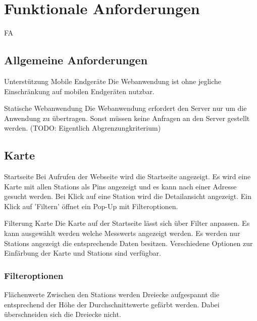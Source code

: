\section{Funktionale Anforderungen}

\setcounter{counter}{10}
\begin{Kriterien}{FA}

\subsection{Allgemeine Anforderungen}

 \item[Unterstützung Mobile Endgeräte]
   Die Webanwendung ist ohne jegliche Einschränkung auf mobilen Endgeräten nutzbar.  

 \item[Statische Webanwendung]
   Die Webanwendung erfordert den Server nur um die Anwendung zu übertragen.
   Sonst müssen keine Anfragen an den Server gestellt werden. (TODO: Eigentlich Abgrenzungkriterium)

\subsection{Karte}

 \item[Startseite]
   Bei Aufrufen der Webseite wird die Startseite angezeigt.
   Es wird eine Karte mit allen \glspl{Station} als \glspl{Pin} angezeigt und es kann nach einer Adresse gesucht werden.
   Bei Klick auf eine Station wird die Detailansicht angezeigt.
   Ein Klick auf 'Filtern' öffnet ein \gls{Pop-Up} mit Filteroptionen.

 \item[Filterung Karte]
   Die Karte auf der Startseite lässt sich über Filter anpassen.
   Es kann ausgewählt werden welche \glspl{Messwert} angezeigt werden.
   Es werden nur \glspl{Station} angezeigt die entsprechende Daten besitzen.
   Verschiedene Optionen zur Einfärbung der Karte und \glspl{Station} sind verfügbar.

 \subsubsection{Filteroptionen}

 \item[Flächenwerte]
   Zwischen den \glspl{Station} werden Dreiecke aufgespannt die entsprechend der Höhe der Durchschnittswerte gefärbt werden.
   Dabei überschneiden sich die Dreiecke nicht.


\end{Kriterien}
